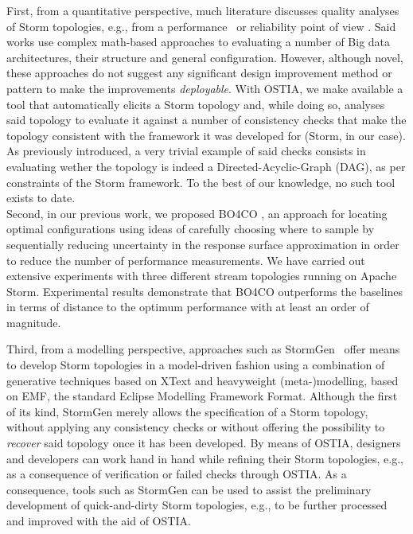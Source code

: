 First, from a quantitative perspective, much literature discusses quality analyses of Storm topologies, e.g., from a performance~\cite{perfbd} or reliability point of view \cite{bigdatareliab}. Said works use complex math-based approaches to evaluating a number of Big data architectures, their structure and general configuration. However, although novel, these approaches do not suggest any significant design improvement method or pattern to make the improvements \emph{deployable}. With OSTIA, we make available a tool that automatically elicits a Storm topology and, while doing so, analyses said topology to evaluate it against a number of consistency checks that make the topology consistent with the framework it was developed for (Storm, in our case). As previously introduced, a very trivial example of said checks consists in evaluating wether the topology is indeed a Directed-Acyclic-Graph (DAG), as per constraints of the Storm framework.  To the best of our knowledge, no such tool exists to date. \\

Second, in our previous work, we proposed {\small \sf BO4CO} \cite{jamshidi-vldb}, an approach for locating optimal configurations using ideas of carefully choosing where to sample by sequentially reducing uncertainty in the response surface approximation in order to reduce the number of performance measurements. We have carried out extensive experiments with three different stream topologies running on Apache Storm. Experimental results demonstrate that {\small \sf BO4CO} outperforms the baselines in terms of distance to the optimum performance with at least an order of magnitude. 

Third, from a modelling perspective, approaches such as StormGen~\cite{stormgen} offer means to develop Storm topologies in a model-driven fashion using a combination of generative techniques based on XText and heavyweight (meta-)modelling, based on EMF, the standard Eclipse Modelling Framework Format. Although the first of its kind, StormGen merely allows the specification of a Storm topology, without applying any consistency checks or without offering the possibility to \emph{recover} said topology once it has been developed. By means of OSTIA, designers and developers can work hand in hand while refining their Storm topologies, e.g., as a consequence of verification or failed checks through OSTIA. As a consequence, tools such as StormGen can be used to assist the preliminary development of quick-and-dirty Storm topologies, e.g., to be further processed and improved with the aid of OSTIA.


